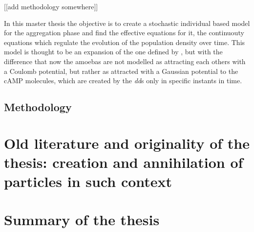 [[add methodology somewhere]]

In this master thesis the objective is to create a stochastic individual based model for the aggregation phase and find the effective equations for it, \ie the continuouty equations which regulate the evolution of the population density over time.
This model is thought to be an expansion of the one defined by \citep{ana}, but with the difference that now the amoebas are not modelled as attracting each others with a Coulomb potential, but rather as attracted with a Gaussian potential to the cAMP molecules, which are created by the \emph{dd}s only in specific instants in time.

\subsection{Methodology}

\section{Old literature and originality of the thesis: creation and annihilation of particles in such context}

\section{Summary of the thesis}





